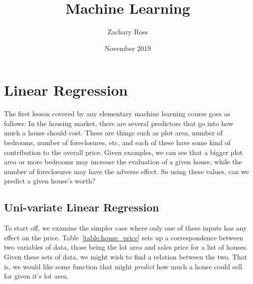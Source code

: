\documentclass{book}[a5paper]
\title{Machine Learning}
\author{Zachary Ross}
\date{November 2019}
\begin{document}
\maketitle



\chapter{Linear Regression}

The first lesson covered by any elementary machine learning course goes as
follows: In the housing market, there are several predictors that go into how
much a house should cost. These are things such as plot area, number of
bedrooms, number of foreclosures, etc, and each of these have some kind of
contribution to the overall price. Given examples, we can see that a bigger plot
area or more bedrooms may increase the evaluation of a given house, while the
number of foreclosures may have the adverse effect. So using these values, can
we predict a given house's worth? 

\section{Uni-variate Linear Regression}


To start off, we examine the simpler case where only one of these inputs has any
effect on the price. Table~\ref{table:house_price} sets up a correspondence
between two variables of data, those being the lot area and sales price for a
list of houses. Given these sets of data, we might wish to find a relation
between the two. That is, we would like some function that might \emph{predict}
how much a house could sell for given it's lot area. 
\end{document}
